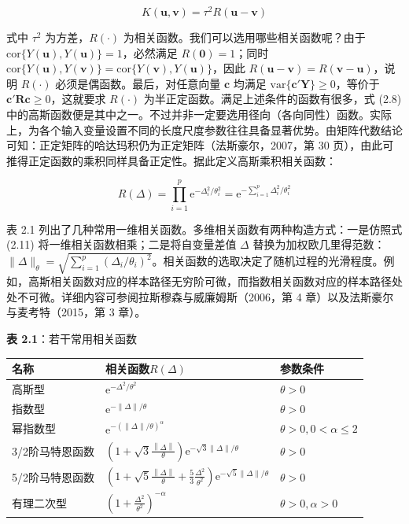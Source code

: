 \documentclass{ctexart}
\begin{document}
\begin{equation*}
K(\boldsymbol{u},\boldsymbol{v})=\tau^2R(\boldsymbol{u}-\boldsymbol{v})
\end{equation*}

式中 $\tau^2$ 为方差，$R(\cdot)$ 为相关函数。我们可以选用哪些相关函数呢？由于 $\mathrm{cor}\{Y(\boldsymbol{u}),Y(\boldsymbol{u})\}=1$，必然满足 $R(\boldsymbol{0})=1$；同时 $\mathrm{cor}\{Y(\boldsymbol{u}),Y(\boldsymbol{v})\}=\mathrm{cor}\{Y(\boldsymbol{v}),Y(\boldsymbol{u})\}$，因此 $R(\boldsymbol{u}-\boldsymbol{v})=R(\boldsymbol{v}-\boldsymbol{u})$，说明 $R(\cdot)$ 必须是偶函数。最后，对任意向量 $\boldsymbol{c}$ 均满足 $\mathrm{var}\{\boldsymbol{c}'\boldsymbol{Y}\}\ge0$，等价于 $\boldsymbol{c}'\boldsymbol{R}\boldsymbol{c}\ge0$，这就要求 $R(\cdot)$ 为半正定函数。满足上述条件的函数有很多，式 (2.8) 中的高斯函数便是其中之一。不过并非一定要选用径向（各向同性）函数。实际上，为各个输入变量设置不同的长度尺度参数往往具备显著优势。由矩阵代数结论可知：正定矩阵的哈达玛积仍为正定矩阵（法斯豪尔，2007，第 30 页），由此可推得正定函数的乘积同样具备正定性。据此定义高斯乘积相关函数：

\begin{equation*}
R(\Delta)=\prod_{i=1}^{p}\mathrm{e}^{-\Delta_i^2/\theta_i^2}=\mathrm{e}^{-\sum_{i=1}^{p}\Delta_i^2/\theta_i^2}
\tag{2.11}
\end{equation*}

表 2.1 列出了几种常用一维相关函数。多维相关函数有两种构造方式：一是仿照式 (2.11) 将一维相关函数相乘；二是将自变量差值 $\Delta$ 替换为加权欧几里得范数：$\|\Delta\|_\theta=\sqrt{\sum_{i=1}^{p}(\Delta_i/\theta_i)^2}$。相关函数的选取决定了随机过程的光滑程度。例如，高斯相关函数对应的样本路径无穷阶可微，而指数相关函数对应的样本路径处处不可微。详细内容可参阅拉斯穆森与威廉姆斯（2006，第 4 章）以及法斯豪尔与麦考特（2015，第 3 章）。

\begin{mdquote}
\textbf{表 2.1}：若干常用相关函数
\end{mdquote}

\begin{table}[htbp]
\begin{tabular}{l|l|l}
\hline
名称 & 相关函数$R(\Delta)$ & 参数条件 \\
\hline
高斯型 & $\mathrm{e}^{-\Delta^2/\theta^2}$ & $\theta>0$ \\
指数型 & $\mathrm{e}^{-\|\Delta\|/\theta}$ & $\theta>0$ \\
幂指数型 & $\mathrm{e}^{-(\|\Delta\|/\theta)^\alpha}$ & $\theta>0,0<\alpha\le2$ \\
3/2阶马特恩函数 & $\left(1+\sqrt{3}\frac{\left\|\Delta\right\|}{\theta}\right)\mathrm{e}^{-\sqrt{3}\|\Delta\|/\theta}$ & $\theta>0$ \\
5/2阶马特恩函数 & $\left(1+\sqrt{5}\frac{\left\|\Delta\right\|}{\theta}+\frac53\frac{\Delta^2}{\theta^2}\right)\mathrm{e}^{-\sqrt{5}\|\Delta\|/\theta}$ & $\theta>0$ \\
有理二次型 & $\left(1+\frac{\Delta^2}{\theta^2}\right)^{-\alpha}$ & $\theta>0,\alpha>0$ \\
\hline
\end{tabular}
\end{table}
\end{document}
